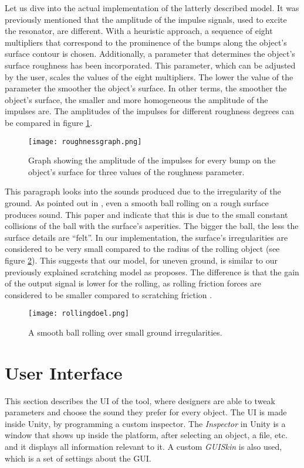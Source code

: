 Let us dive into the actual implementation of the latterly described model. It was previously mentioned that the amplitude of the impulse signals, used to excite the resonator, are different. With a heuristic approach, a sequence of eight multipliers that correspond to the prominence of the bumps along the object's surface contour is chosen. Additionally, a parameter that determines the object's surface roughness has been incorporated. This parameter, which can be adjusted by the user, scales the values of the eight multipliers. The lower the value of the parameter the smoother the object's surface. In other terms, the smoother the object's surface, the smaller and more homogeneous the amplitude of the impulses are. The amplitudes of the impulses for different roughness degrees can be compared in figure  \ref{fig:roughnessgraph}.

\begin{figure}[H]
  \centering
    \texttt{[image: roughnessgraph.png]}
      \caption{Graph showing the amplitude of the impulses for every bump on the object's surface for three values of the roughness parameter.}
      \label{fig:roughnessgraph}
\end{figure} 

This paragraph looks into the sounds produced due to the irregularity of the ground. As pointed out in \cite{van2001foleyautomatic}, even a smooth ball rolling on a rough surface produces sound. This paper and \cite{rath2003expressive} indicate that this is due to the small constant collisions of the ball with the surface's asperities. The bigger the ball, the less the surface details are ``felt''. In our implementation, the surface's irregularities are considered to be very small compared to the radius of the rolling object (see figure \ref{fig:rollingdoel}). This suggests that our model, for uneven ground, is similar to our previously explained scratching model as \cite{van2001foleyautomatic} proposes. The difference is that the gain of the output signal is lower for the rolling, as rolling friction forces are considered to be smaller compared to scratching friction \cite{mehtas}.

\begin{figure}[H]
  \centering
    \texttt{[image: rollingdoel.png]}
      \caption{A smooth ball rolling over small ground irregularities.}
      \label{fig:rollingdoel}
\end{figure} 



\section{User Interface}\label{sec:UI}
This section describes the \gls{UI} of the tool, where designers are able to tweak parameters and choose the sound they prefer for every object. The \gls{UI} is made inside Unity\textsuperscript{\textregistered}, by programming a custom inspector. The \textit{Inspector} in Unity\textsuperscript{\textregistered} is a window that shows up inside the platform, after selecting an object, a file, etc. and it displays all information relevant to it. A custom \textit{GUISkin} is also used, which is a set of settings about the \gls{GUI}. 


